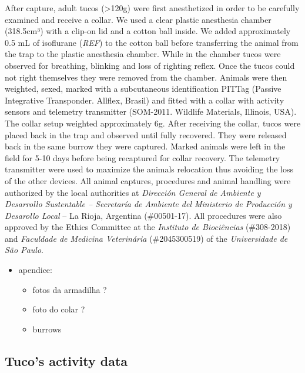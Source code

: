 \documentclass[msc,numbers,hidelinks]{coppe}
\providecommand{\tightlist}{%
  \setlength{\itemsep}{0pt}\setlength{\parskip}{0pt}}
\begin{document}
  After capture, adult tucos (\textgreater120g) were first anesthetized in order to be carefully examined and receive a collar. We used a clear plastic anesthesia chamber (318.5cm³) with a clip-on lid and a cotton ball inside. We added approximately 0.5 mL of isoflurane (\emph{REF}) to the cotton ball before transferring the animal from the trap to the plastic anesthesia chamber. While in the chamber tucos were observed for breathing, blinking and loss of righting reflex. Once the tucos could not right themselves they were removed from the chamber. Animals were then weighted, sexed, marked with a subcutaneous identification PITTag (Passive Integrative Transponder. Allflex, Brasil) and fitted with a collar with activity sensors and telemetry transmitter (SOM-2011. Wildlife Materials, Illinois, USA). The collar setup weighted approximately 6g. After receiving the collar, tucos were placed back in the trap and observed until fully recovered. They were released back in the same burrow they were captured. Marked animals were left in the field for 5-10 days before being recaptured for collar recovery. The telemetry transmitter were used to maximize the animals relocation thus avoiding the loss of the other devices. All animal captures, procedures and animal handling were authorized by the local authorities at \emph{Dirección General de Ambiente y Desarrollo Sustentable -- Secretaría de Ambiente del Ministerio de Producción y Desarollo Local} -- La Rioja, Argentina (\#00501-17). All procedures were also approved by the Ethics Committee at the \emph{Instituto de Biociências} (\#308-2018) and \emph{Faculdade de Medicina Veterinária} (\#2045300519) of the \emph{Universidade de São Paulo}.
  \begin{itemize}
  \tightlist
  \item
    apendice:
    \begin{itemize}
    \tightlist
    \item
      fotos da armadilha ?
    \item
      foto do colar ?
    \item
      burrows
    \end{itemize}
  \end{itemize}
  \hypertarget{tucos-activity-data}{%
  \subsection{Tuco's activity data}\label{tucos-activity-data}}
\end{document}
